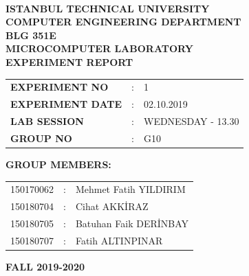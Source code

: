\documentclass[pdftex,12pt,a4paper]{article}
\begin{document}
\begin{titlepage}
\begin{center}
\textbf{}\\
\textbf{\Large{ISTANBUL TECHNICAL UNIVERSITY}}\\
\vspace{0.5cm}
\textbf{\Large{COMPUTER ENGINEERING DEPARTMENT}}\\
\vspace{2cm}
\textbf{\Large{BLG 351E\\ MICROCOMPUTER LABORATORY\\ EXPERIMENT REPORT}}\\
\vspace{2.8cm}
\begin{table}[ht]
\centering
\Large{
\begin{tabular}{lcl}
\textbf{EXPERIMENT NO}  & : & 1 \\
\textbf{EXPERIMENT DATE}  & : & 02.10.2019 \\
\textbf{LAB SESSION}  & : & WEDNESDAY - 13.30 \\
\textbf{GROUP NO}  & : & G10 \\
\end{tabular}}
\end{table}
\vspace{1cm}
\textbf{\Large{GROUP MEMBERS:}}\\
\begin{table}[ht]
\centering
\Large{
\begin{tabular}{rcl}
150170062  & : & Mehmet Fatih YILDIRIM \\
150180704  & : & Cihat AKK\.{I}RAZ \\
150180705  & : & Batuhan Faik DER\.{I}NBAY \\
150180707  & : & Fatih ALTINPINAR \\
\end{tabular}}
\end{table}
\vspace{2.8cm}
\textbf{\Large{FALL 2019-2020}}

\end{center}

\end{titlepage}

\newpage


\thispagestyle{empty}
\setcounter{tocdepth}{4}
\tableofcontents
\clearpage

\setcounter{page}{1}
\end{document}
